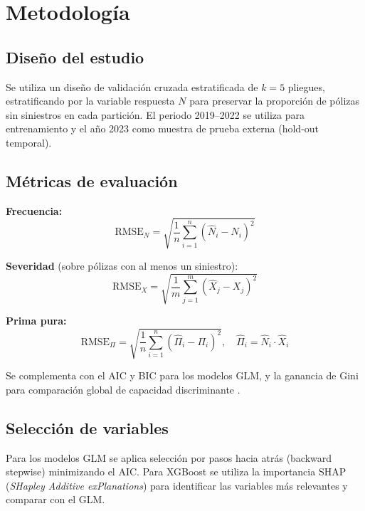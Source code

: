 
\section{Metodología}
\label{sec:metodo}

\subsection{Diseño del estudio}

Se utiliza un diseño de validación cruzada estratificada de $k=5$ pliegues, estratificando por la variable respuesta $N$ para preservar la proporción de pólizas sin siniestros en cada partición. El periodo 2019–2022 se utiliza para entrenamiento y el año 2023 como muestra de prueba externa (hold-out temporal).

\subsection{Métricas de evaluación}

\textbf{Frecuencia:}
\begin{equation}
  \text{RMSE}_N = \sqrt{\frac{1}{n}\sum_{i=1}^{n}(\hat{N}_i - N_i)^2}
\end{equation}

\textbf{Severidad} (sobre pólizas con al menos un siniestro):
\begin{equation}
  \text{RMSE}_X = \sqrt{\frac{1}{m}\sum_{j=1}^{m}(\hat{X}_j - X_j)^2}
\end{equation}

\textbf{Prima pura:}
\begin{equation}
  \text{RMSE}_\Pi = \sqrt{\frac{1}{n}\sum_{i=1}^{n}(\hat{\Pi}_i - \Pi_i)^2}, \quad \hat{\Pi}_i = \hat{N}_i \cdot \hat{X}_i
\end{equation}

Se complementa con el AIC y BIC para los modelos GLM, y la ganancia de Gini para comparación global de capacidad discriminante \citep{Frees2014}.

\subsection{Selección de variables}

Para los modelos GLM se aplica selección por pasos hacia atrás (backward stepwise) minimizando el AIC. Para XGBoost se utiliza la importancia SHAP (\textit{SHapley Additive exPlanations}) para identificar las variables más relevantes y comparar con el GLM.
